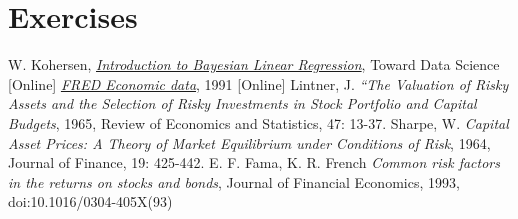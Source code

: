 %
%
%
\newpage
\section*{Exercises}


\begin{thebibliography}{9}
W. Kohersen, \href{https://towardsdatascience.com/introduction-to-bayesian-linear-regression-e66e60791ea7}{\emph{Introduction to Bayesian Linear Regression}}, Toward Data Science [Online]
\href{https://fred.stlouisfed.org/}{\emph{FRED Economic data}}, 1991 [Online]
 Lintner, J. \emph{“The Valuation of Risky Assets and the Selection of Risky Investments in Stock Portfolio and Capital Budgets}, 1965, Review of Economics and
Statistics, 47: 13-37.
 Sharpe, W. \emph{Capital Asset Prices: A Theory of Market Equilibrium under Conditions of Risk}, 1964, Journal of Finance, 19: 425-442.
 E. F. Fama, K. R. French \emph{Common risk factors in the returns on stocks and bonds}, Journal of Financial Economics, 1993, doi:10.1016/0304-405X(93)
\end{thebibliography}



